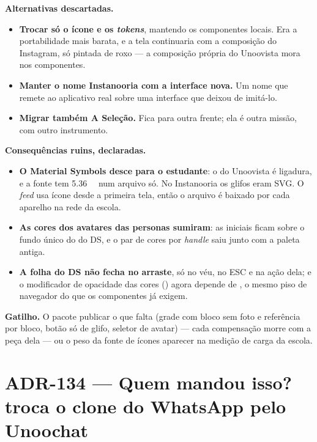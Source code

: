 \textbf{Alternativas descartadas.}

\begin{itemize}
  \item \textbf{Trocar só o ícone e os \emph{tokens}}, mantendo os componentes
    locais. Era a portabilidade mais barata, e a tela continuaria com a
    composição do Instagram, só pintada de roxo --- a composição própria do
    Unoovista mora nos componentes.
  \item \textbf{Manter o nome Instanooria com a interface nova.} Um nome que
    remete ao aplicativo real sobre uma interface que deixou de imitá-lo.
  \item \textbf{Migrar também A Seleção.} Fica para outra frente; ela é outra
    missão, com outro instrumento.
\end{itemize}

\textbf{Consequências ruins, declaradas.}

\begin{itemize}
  \item \textbf{O Material Symbols desce para o estudante}: o  do
    Unoovista é ligadura, e a fonte tem \SI{5.36}{\mega\byte} num arquivo só.
    No Instanooria os glifos eram SVG. O \emph{feed} usa ícone desde a primeira
    tela, então o arquivo é baixado por cada aparelho na rede da escola.
  \item \textbf{As cores dos avatares das personas sumiram}: as iniciais ficam
    sobre o fundo único do  do DS, e o par de cores por
    \emph{handle} saiu junto com a paleta antiga.
  \item \textbf{A folha do DS não fecha no arraste}, só no véu, no ESC e na
    ação dela; e o modificador de opacidade das cores () agora
    depende de , o mesmo piso de navegador do  que os
    componentes já exigem.
\end{itemize}

\textbf{Gatilho.} O pacote publicar o que falta (grade com bloco sem foto e
referência por bloco, botão só de glifo, seletor de avatar) --- cada
compensação morre com a peça dela --- ou o peso da fonte de ícones aparecer na
medição de carga da escola.

\section{ADR-134 --- Quem mandou isso? troca o clone do WhatsApp pelo Unoochat}
\label{adr:exp05ef1b-unoochat}

